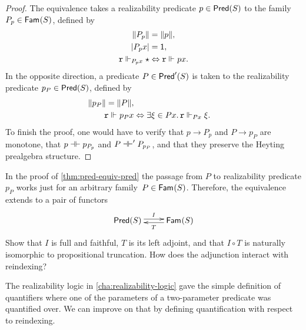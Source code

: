 \begin{proof}
  The equivalence takes a realizability predicate $p \in \Pred{S}$ to the family
  $P_p \in \Fam{S}$, defined by
  \begin{align*}
    \T{P_p} &= \T{p}, \\
    \S{P_p x} &= \one, \\
    \R{r} \rz[P_p x] \star &\liff \R{r} \rz p x.
  \end{align*}
  In the opposite direction, a predicate $P \in \PredT{S}$ is taken to the realizability predicate $p_P \in \Pred{S}$, defined by
  \begin{align*}
    \T{p_P} = \T{P}, \\
    \R{r} \rz p_P x &\liff \some{\xi \in P x} \R{r} \rz[P x] \xi.
  \end{align*}
  To finish the proof, one would have to verify that $p \to P_p$ and $P \to p_P$ are monotone, that $p \bientails p_{P_p}$ and $P \bientails' P_{p_P}$, and that they preserve the Heyting prealgebra structure.
\end{proof}

\begin{exercise}
  In the proof of \cref{thm:pred-equiv-pred} the passage from $P$ to realizability predicate $p_P$ works just for an arbitrary family~$P \in \Fam{S}$. Therefore, the equivalence extends to a pair of functors
  \begin{equation*}
    \xymatrix{
      {\Pred{S}}
      \ar@<0.5ex>[r]^{I}
      &
      {\Fam{S}}
      \ar@<0.5ex>[l]^{T}
    }
  \end{equation*}
  Show that $I$ is full and faithful, $T$ is its left adjoint, and that $I \circ T$ is naturally isomorphic to propositional truncation. How does the adjunction interact with reindexing?
\end{exercise}

The realizability logic in \cref{cha:realizability-logic} gave the simple definition of quantifiers where one of the parameters of a two-parameter predicate was quantified over. We can improve on that by defining quantification with respect to reindexing.

